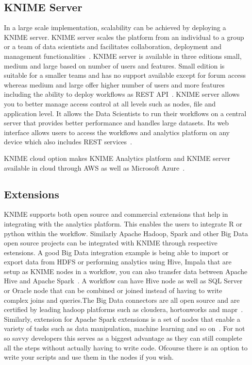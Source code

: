 \subsection{KNIME Server}
In a large scale implementation, scalability can be achieved by deploying a
KNIME server. KNIME server scales the platform from an individual to a group or
a team of data scientists and facilitates collaboration, deployment and
management functionalities~\cite{hid-sp18-517-server}. KNIME server is available
in three editions small, medium and large based on number of users and
features. Small edition is suitable for a smaller teams and has no support
available except for forum access whereas medium and large offer higher number
of users and more features including the ability to deploy workflows as REST
API~\cite{hid-sp18-517-editions}.  KNIME server allows you to better manage
access control at all levels such as nodes, file and application level. It
allows the Data Scientists to run their workflows on a central server that
provides better performance and handles large datasets. Its web interface allows
users to access the workflows and analytics platform on any device which also
includes REST services~\cite{hid-sp18-517-editions}.

KNIME cloud option makes KNIME Analytics platform and KNIME server available in
cloud through AWS as well as Microsoft Azure~\cite{hid-sp18-517-cloud}.

\subsection{Extensions}
KNIME supports both open source and commercial extensions that help in
integrating with the analytics platform. This enables the users to integrate R
or python within the workflow. Similarly Apache Hadoop, Spark and other Big Data
open source projects can be integrated with KNIME through respective
estensions. A good Big Data integration example is being able to import or
export data from HDFS or performing analytics using Hive, Impala that are setup
as KNIME nodes in a workflow, you can also transfer data between Apache Hive 
and Apache Spark~\cite{hid-sp18-517-ksw}. A workflow can have Hive node as well 
as SQL Server or Oracle node that can be combined or joined instead of having to 
write complex joins and queries.The Big Data connectors
are all open source and are certified by leading hadoop platforms such as
cloudera, hortonworks and mapr~\cite{hid-sp18-517-bde}.  Similarly, extension
for Apache Spark extensions is a set of nodes that enable a variety of tasks
such as data manipulation, machine learning and so on~\cite{hid-sp18-517-spark}.
For not so savvy developers this serves as a biggest advantage as they can still
complete all the steps without actually having to write code. Ofcourse there is
an option to write your scripts and use them in the nodes if you wish.


